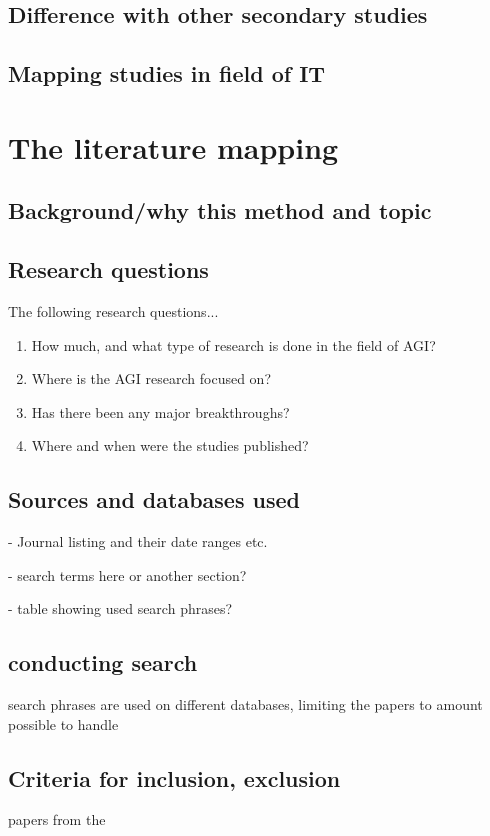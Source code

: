\documentclass[utf8,english]{gradu3}
\begin{document}
\section{Difference with other secondary studies}

\section{Mapping studies in field of IT}

\chapter{The literature mapping}

\section{Background/why this method and topic}

\section{Research questions}

The following research questions...

\begin{enumerate}
  \item How much, and what type of research is done in the field of AGI?
  \item Where is the AGI research focused on?
  \item Has there been any major breakthroughs?
  \item Where and when were the studies published?
\end{enumerate}

\section{Sources and databases used}
- Journal listing and their date ranges etc.

- search terms here or another section? 

- table showing used search phrases?

\section{conducting search}
search phrases are used on different databases, limiting the papers to amount possible to handle

\section{Criteria for inclusion, exclusion}
papers from the 
\end{document}
